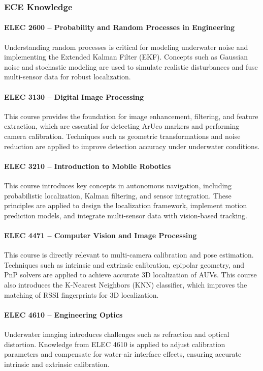 \documentclass[11pt]{article}
\begin{document}
        \subsubsection{ECE Knowledge}
            \paragraph{ELEC 2600 – Probability and Random Processes in Engineering}
            Understanding random processes is critical for modeling underwater noise and implementing the Extended Kalman Filter (EKF). Concepts such as Gaussian noise and stochastic modeling are used to simulate realistic disturbances and fuse multi-sensor data for robust localization.
            \paragraph{ELEC 3130 – Digital Image Processing}
            This course provides the foundation for image enhancement, filtering, and feature extraction, which are essential for detecting ArUco markers and performing camera calibration. Techniques such as geometric transformations and noise reduction are applied to improve detection accuracy under underwater conditions.
            \paragraph{ELEC 3210 – Introduction to Mobile Robotics}
            This course introduces key concepts in autonomous navigation, including probabilistic localization, Kalman filtering, and sensor integration. These principles are applied to design the localization framework, implement motion prediction models, and integrate multi-sensor data with vision-based tracking.
            \paragraph{ELEC 4471 – Computer Vision and Image Processing}
            This course is directly relevant to multi-camera calibration and pose estimation. Techniques such as intrinsic and extrinsic calibration, epipolar geometry, and PnP solvers are applied to achieve accurate 3D localization of AUVs. This course also introduces the K-Nearest Neighbors (KNN) classifier, which improves the matching of RSSI fingerprints for 3D localization.
            \paragraph{ELEC 4610 – Engineering Optics}
            Underwater imaging introduces challenges such as refraction and optical distortion. Knowledge from ELEC 4610 is applied to adjust calibration parameters and compensate for water-air interface effects, ensuring accurate intrinsic and extrinsic calibration.
\end{document}
